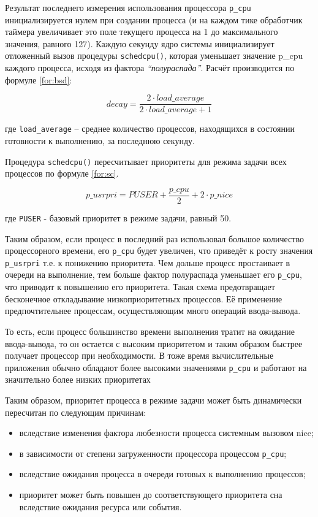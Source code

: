 Результат последнего измерения использования процессора \texttt{p\_cpu} инициализируется нулем при создании процесса (и на каждом тике обработчик таймера увеличивает это поле текущего процесса на 1 до максимального значения, равного 127). Каждую секунду ядро системы инициализирует отложенный вызов процедуры \texttt{schedcpu()}, которая уменьшает значение p\_cpu каждого процесса, исходя из фактора \textit{``полураспада''}. Расчёт производится по формуле \eqref{for:bsd}:

\begin{equation}
    \label{for:bsd}
    decay = \frac{2 \cdot load\_average}{2 \cdot load\_average + 1}
\end{equation}

где \texttt{load\_average} -- среднее количество процессов, находящихся в состоянии готовности к выполнению, за последнюю секунду.

Процедура \texttt{schedcpu()} пересчитывает приоритеты для режима задачи всех процессов по формуле \eqref{for:sc}.

\begin{equation}
    \label{for:sc}
    p\_usrpri = PUSER + \frac{p\_cpu}{2} + 2 \cdot p\_nice
\end{equation}

где \texttt{PUSER} - базовый приоритет в режиме задачи, равный 50.

Таким образом, если процесс в последний раз использовал большое количество процессорного времени, его \texttt{p\_cpu} будет увеличен, что приведёт к росту значения \texttt{p\_usrpri} т.е. к понижению приоритета. Чем дольше процесс простаивает в очереди на выполнение, тем больше фактор полураспада уменьшает его \texttt{p\_cpu}, что приводит к повышению его приоритета. Такая схема предотвращает бесконечное откладывание низкоприоритетных процессов. Её применение предпочтительнее процессам, осуществляющим много операций ввода-вывода.

То есть, если процесс большинство времени выполнения тратит на ожидание ввода-вывода, то он остается с высоким приоритетом и таким образом быстрее получает процессор при необходимости. В тоже время вычислительные приложения обычно обладают более высокими значениями \texttt{p\_cpu} и работают на значительно более низких приоритетах

Таким образом, приоритет процесса в режиме задачи может быть динамически пересчитан по следующим причинам:
\begin{itemize}
    \item вследствие изменения фактора любезности процесса системным вызовом nice;
    \item в зависимости от степени загруженности процессора процессом \texttt{p\_cpu};
    \item вследствие ожидания процесса в очереди готовых к выполнению процессов;
    \item приоритет может быть повышен до соответствующего приоритета сна вследствие ожидания ресурса или события.
\end{itemize}

